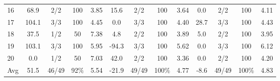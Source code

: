 \begin{table}[p]
{\begin{tabular}{l|cccc|cccc|cccc}
16 & 68.9 & 2/2 & 100 & 3.85 & 15.6 & 2/2 & 100 & 3.64 & 0.0 & 2/2 & 100 & 4.11 \\
17 & 104.1 & 3/3 & 100 & 4.45 & 0.0 & 3/3 & 100 & 4.40 & 28.7 & 3/3 & 100 & 4.43 \\
18 & 37.5 & 1/2 & 50 & 7.38 & 4.8 & 2/2 & 100 & 3.89 & 5.0 & 2/2 & 100 & 3.95 \\
19 & 103.1 & 3/3 & 100 & 5.95 & -94.3 & 3/3 & 100 & 5.62 & 0.0 & 3/3 & 100 & 6.12 \\
20 & 0.0 & 1/2 & 50 & 7.03 & 42.0 & 2/2 & 100 & 3.36 & 0.0 & 2/2 & 100 & 4.20 \\
\midrule
Avg & 51.5 & 46/49 & 92\% & 5.54 & -21.9 & 49/49 & 100\% & 4.77 & -8.6 & 49/49 & 100\% & 4.83 \\
\bottomrule
\end{tabular}%
}
\end{table}
